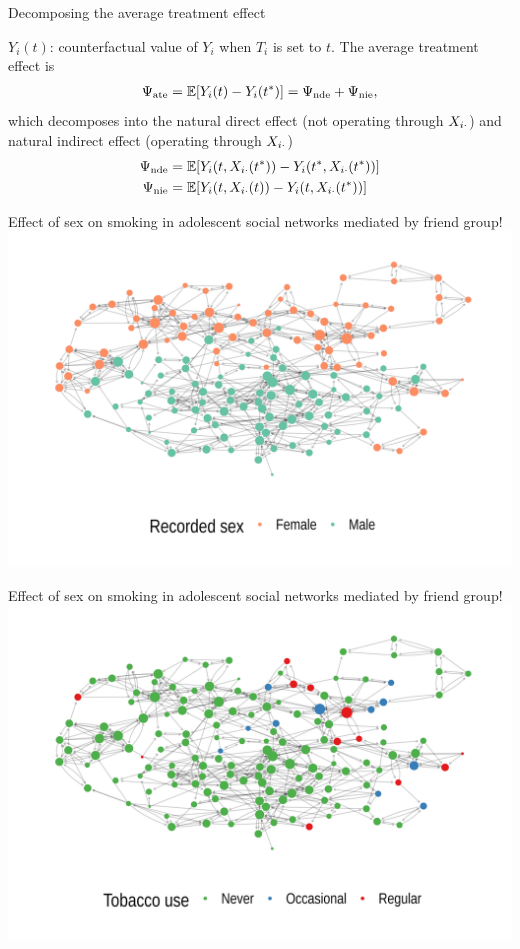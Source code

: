 \documentclass{beamer}
\theoremstyle{remark}
\begin{document}
\begin{frame}{Decomposing the average treatment effect}

    $Y_i(t)$: counterfactual value of $Y_i$ when $T_i$ is set to $t$. The average treatment effect is
    \begin{align*}
        \ate = \E{Y_i(t) - Y_i(t^*)} = \nde + \nie,
    \end{align*}
    which decomposes into the natural direct effect (not operating through $X_{i \cdot}$) and natural indirect effect (operating through $X_{i \cdot}$)
    \begin{align*}
        \nde & = \E{Y_i (t, \X_{i \cdot}(t^*)) - Y_i (t^*, \X_{i \cdot} (t^*))} \\
        \nie & = \E{Y_i (t, \X_{i \cdot}(t)) - Y_i (t, \X_{i \cdot} (t^*))}
    \end{align*}
\end{frame}

\begin{frame}{Effect of sex on smoking in adolescent social networks mediated by friend group!}
    \centering
    \includegraphics[width=\textwidth]{figures/glasgow/sex.png}
\end{frame}

\begin{frame}{Effect of sex on smoking in adolescent social networks mediated by friend group!}
    \centering
    \includegraphics[width=\textwidth]{figures/glasgow/tobacco.png}
\end{frame}
\end{document}

